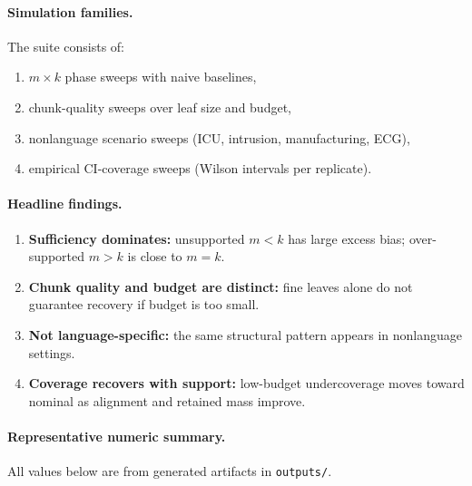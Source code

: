 \paragraph{Simulation families.}
The suite consists of:
\begin{enumerate}[nosep]
    \item \(m\times k\) phase sweeps with naive baselines,
    \item chunk-quality sweeps over leaf size and budget,
    \item nonlanguage scenario sweeps (ICU, intrusion, manufacturing, ECG),
    \item empirical CI-coverage sweeps (Wilson intervals per replicate).
\end{enumerate}

\paragraph{Headline findings.}
\begin{enumerate}[nosep]
    \item \textbf{Sufficiency dominates:} unsupported \(m<k\) has large excess bias; over-supported \(m>k\) is close to \(m=k\).
    \item \textbf{Chunk quality and budget are distinct:} fine leaves alone do not guarantee recovery if budget is too small.
    \item \textbf{Not language-specific:} the same structural pattern appears in nonlanguage settings.
    \item \textbf{Coverage recovers with support:} low-budget undercoverage moves toward nominal as alignment and retained mass improve.
\end{enumerate}

\paragraph{Representative numeric summary.}
All values below are from generated artifacts in \texttt{outputs/}.

